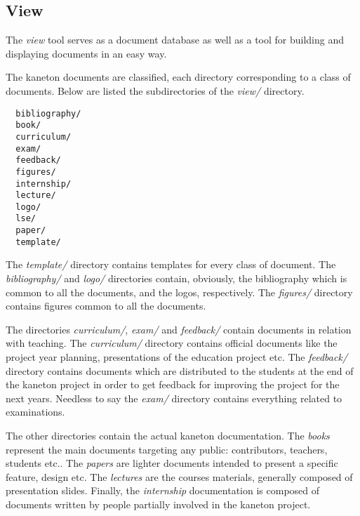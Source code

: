 %
%
%
%
%
%

%
%

\subsection{View}
\label{section:view}

The \textit{view} tool serves as a document database as well as a tool for
building and displaying documents in an easy way.

The kaneton documents are classified, each directory corresponding to a
class of documents. Below are listed the subdirectories of the \textit{view/}
directory.

\begin{verbatim}
  bibliography/
  book/
  curriculum/
  exam/
  feedback/
  figures/
  internship/
  lecture/
  logo/
  lse/
  paper/
  template/
\end{verbatim}

The \textit{template/} directory contains templates for every class of
document. The \textit{bibliography/} and \textit{logo/} directories contain,
obviously, the bibliography which is common to all the documents, and the
logos, respectively. The \textit{figures/} directory contains figures
common to all the documents.

The directories \textit{curriculum/}, \textit{exam/} and \textit{feedback/}
contain documents in relation with teaching. The \textit{curriculum/}
directory contains official documents like the project year planning,
presentations of the education project etc. The \textit{feedback/}
directory contains documents which are distributed to the students
at the end of the kaneton project in order to get feedback for improving
the project for the next years. Needless to say the \textit{exam/} directory
contains everything related to examinations.

The other directories contain the actual kaneton documentation. The
\textit{books} represent the main documents targeting any public:
contributors, teachers, students etc.. The \textit{papers} are lighter
documents intended to present a specific feature, design etc. The
\textit{lectures} are the courses materials, generally composed of
presentation slides. Finally, the \textit{internship} documentation is
composed of documents written by people partially involved in the kaneton
project.

